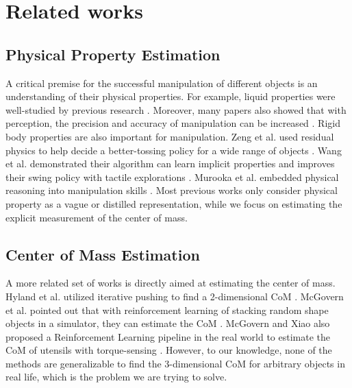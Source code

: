 \section{Related works}
\subsection{Physical Property Estimation}
A critical premise for the successful manipulation of different objects is an understanding of their physical properties. For example, liquid properties were well-studied by previous research \cite{joe-liquid} \cite{xiaofeng-solid} \cite{matl}. Moreover, many papers also showed that with perception, the precision and accuracy of manipulation can be increased \cite{stir-to-pour} \cite{joe-kitchen} \cite{pancake24}. 
Rigid body properties are also important for manipulation. Zeng et al. used residual physics to help decide a better-tossing policy for a wide range of objects \cite{zeng2019tossingbot}. Wang et al. demonstrated their algorithm can learn implicit properties and improves their swing policy with tactile explorations \cite{swingbot}. Murooka et al. embedded physical reasoning into manipulation skills \cite{murooka_physics}. Most previous works only consider physical property as a vague or distilled representation, while we focus on estimating the explicit measurement of the center of mass.  
\subsection{Center of Mass Estimation}
A more related set of works is directly aimed at estimating the center of mass. Hyland et al. utilized iterative pushing to find a 2-dimensional CoM \cite{com23}. McGovern et al. pointed out that with reinforcement learning of stacking random shape objects in a simulator, they can estimate the CoM \cite{com19}. McGovern and Xiao also proposed a Reinforcement Learning pipeline in the real world to estimate the CoM of utensils with torque-sensing \cite{com22}. However, to our knowledge, none of the methods are generalizable to find the 3-dimensional CoM for arbitrary objects in real life, which is the problem we are trying to solve. 

